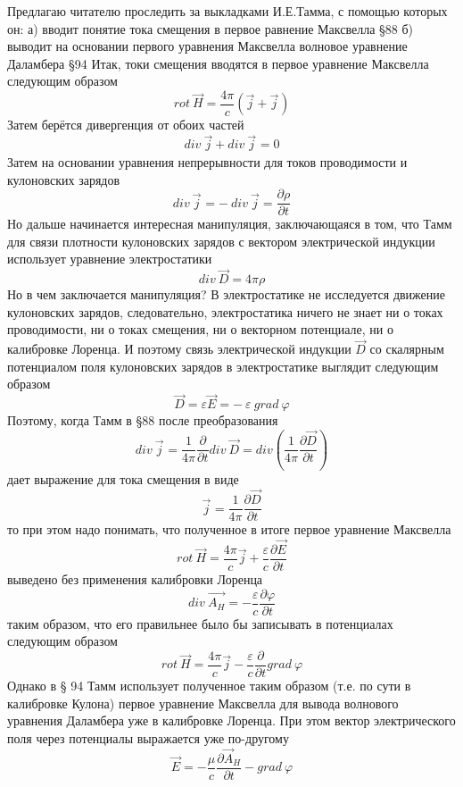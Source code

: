 \documentclass[11pt]{article}
\begin{document}
Предлагаю читателю проследить за выкладками И.Е.Тамма, с помощью которых
он: а) вводит понятие тока смещения в первое равнение Максвелла §88 б)
выводит на основании первого уравнения Максвелла волновое уравнение
Даламбера §94 Итак, токи смещения вводятся в первое уравнение Максвелла
следующим образом
\[rot\ \overrightarrow{H}=\frac{4\pi }{c}\left( \overrightarrow{j}+{{\overrightarrow{j}}_{}} \right)\]
Затем берётся дивергенция от обоих частей
\[div\ \overrightarrow{j}+div\ {{\overrightarrow{j}}_{}}=0\] Затем на
основании уравнения непрерывности для токов проводимости и кулоновских
зарядов
\[div\ {{\overrightarrow{j}}_{}}=-\ div\ \overrightarrow{j}=\frac{\partial \rho }{\partial t}\]
Но дальше начинается интересная манипуляция, заключающаяся в том, что
Тамм для связи плотности кулоновских зарядов с вектором электрической
индукции использует уравнение электростатики
\[div\ \overrightarrow{D}=4\pi \rho \] Но в чем заключается манипуляция?
В электростатике не исследуется движение кулоновских зарядов,
следовательно, электростатика ничего не знает ни о токах проводимости,
ни о токах смещения, ни о векторном потенциале, ни о калибровке Лоренца.
И поэтому связь электрической индукции \(\overrightarrow{D}\) со
скалярным потенциалом поля кулоновских зарядов в электростатике выглядит
следующим образом
\[\overrightarrow{D}=\varepsilon \overrightarrow{E}=-\ \varepsilon \ grad\ \varphi \]
Поэтому, когда Тамм в §88 после преобразования
\[div\ {{\overrightarrow{j}}_{}}=\frac{1}{4\pi }\frac{\partial }{\partial t}div\ \overrightarrow{D}=div\left( \frac{1}{4\pi }\frac{\partial \overrightarrow{D}}{\partial t} \right)\]
дает выражение для тока смещения в виде
\[{{\overrightarrow{j}}_{}}=\frac{1}{4\pi }\frac{\partial \overrightarrow{D}}{\partial t}\]
то при этом надо понимать, что полученное в итоге первое уравнение
Максвелла
\[rot\ \overrightarrow{H}=\frac{4\pi }{c}\overrightarrow{j}+\frac{\varepsilon }{c}\frac{\partial \overrightarrow{E}}{\partial t}\]
выведено без применения калибровки Лоренца
\[div\ \overrightarrow{{{A}_{H}}}=-\frac{\varepsilon }{c}\frac{\partial \varphi }{\partial t}\]
таким образом, что его правильнее было бы записывать в потенциалах
следующим образом
\[rot\ \overrightarrow{H}=\frac{4\pi }{c}\overrightarrow{j}-\frac{\varepsilon }{c}\frac{\partial }{\partial t}grad\ \varphi \]
Однако в § 94 Тамм использует полученное таким образом (т.е. по сути в
калибровке Кулона) первое уравнение Максвелла для вывода волнового
уравнения Даламбера уже в калибровке Лоренца. При этом вектор
электрического поля через потенциалы выражается уже по-другому
\[\overrightarrow{E}=-\frac{\mu }{c}\frac{\partial {{\overrightarrow{A}}_{H}}}{\partial t}-grad\ \varphi \]
\end{document}
